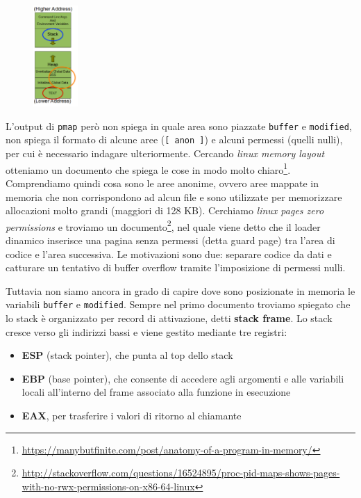 \begin{figure}[hbpt!]
    \centering
    \includegraphics[width= 0.15\textwidth]{./Images/cap7/7.1.png}
\end{figure}
\FloatBarrier

L'output di \texttt{pmap} però non spiega in quale area sono piazzate \texttt{buffer} e \texttt{modified}, non spiega il formato di alcune aree (\texttt{[ anon ]}) e alcuni permessi (quelli nulli), per cui è necessario indagare ulteriormente. Cercando \textit{linux memory layout} otteniamo un documento che spiega le cose in modo molto chiaro\footnote{\href{https://manybutfinite.com/post/anatomy-of-a-program-in-memory/}{https://manybutfinite.com/post/anatomy-of-a-program-in-memory/}}. Comprendiamo quindi cosa sono le aree anonime, ovvero aree mappate in memoria che non corrispondono ad alcun file e sono utilizzate per memorizzare allocazioni molto grandi (maggiori di 128 KB). Cerchiamo \textit{linux pages zero permissions} e troviamo un documento\footnote{\href{http://stackoverflow.com/questions/16524895/proc-pid-maps-shows-pages-with-no-rwx-permissions-on-x86-64-linux}{http://stackoverflow.com/questions/16524895/proc-pid-maps-shows-pages-with-no-rwx-permissions-on-x86-64-linux}}, nel quale viene detto che il loader dinamico inserisce una pagina senza permessi (detta guard page) tra l'area di codice e l'area successiva. Le motivazioni sono due: separare codice da dati e catturare un tentativo di buffer overflow tramite l'imposizione di permessi nulli. 

Tuttavia non siamo ancora in grado di capire dove sono posizionate in memoria le variabili \texttt{buffer} e \texttt{modified}. Sempre nel primo documento troviamo spiegato che lo stack è organizzato per record di attivazione, detti \textbf{stack frame}. Lo stack cresce verso gli indirizzi bassi e viene gestito mediante tre registri:
\begin{itemize}
    \item \textbf{ESP} (stack pointer), che punta al top dello stack
    \item \textbf{EBP} (base pointer), che consente di accedere agli argomenti e alle variabili locali all'interno del frame associato alla funzione in esecuzione
    \item \textbf{EAX}, per trasferire i valori di ritorno al chiamante
\end{itemize}

